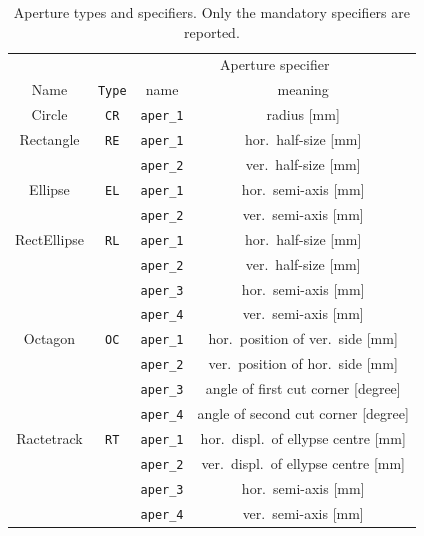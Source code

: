 \begin{center}
\begin{longtable}{|c|c|c|c|}%
    \caption{Aperture types and specifiers. Only the mandatory specifiers are reported.}
    \label{tab:apeSpecs} \\*
    \hline
    \rowcolor{blue!30}
    & & \multicolumn{2}{|c|}{Aperture specifier} \\*
    \rowcolor{blue!30}
    Name & \texttt{Type} & name & meaning \\*
    \hline
    \endfirsthead

    Circle  & \texttt{CR} & \texttt{aper\_1} & radius [mm] \\*
    \hline

    Rectangle & \texttt{RE} & \texttt{aper\_1} & hor.~half-size [mm] \\*
    & & \texttt{aper\_2} & ver.~half-size [mm] \\*
    \hline

    Ellipse & \texttt{EL} & \texttt{aper\_1} & hor.~semi-axis [mm] \\*
    & & \texttt{aper\_2} & ver.~semi-axis [mm] \\*
    \hline

    RectEllipse & \texttt{RL} & \texttt{aper\_1} & hor.~half-size [mm] \\*
    & & \texttt{aper\_2} & ver.~half-size [mm] \\*
    & & \texttt{aper\_3} & hor.~semi-axis [mm] \\*
    & & \texttt{aper\_4} & ver.~semi-axis [mm] \\*
    \hline

    Octagon & \texttt{OC} & \texttt{aper\_1} & hor.~position of ver.~side [mm] \\*
    & & \texttt{aper\_2} & ver.~position of hor.~side [mm] \\*
    & & \texttt{aper\_3} & angle of first cut corner [degree] \\*
    & & \texttt{aper\_4} & angle of second cut corner [degree] \\*
    \hline

    Ractetrack & \texttt{RT} & \texttt{aper\_1} & hor.~displ.~of ellypse centre [mm] \\*
    & & \texttt{aper\_2} & ver.~displ.~of ellypse centre [mm] \\*
    & & \texttt{aper\_3} & hor.~semi-axis [mm] \\*
    & & \texttt{aper\_4} & ver.~semi-axis [mm] \\*
    \hline


\end{longtable}
\end{center}
